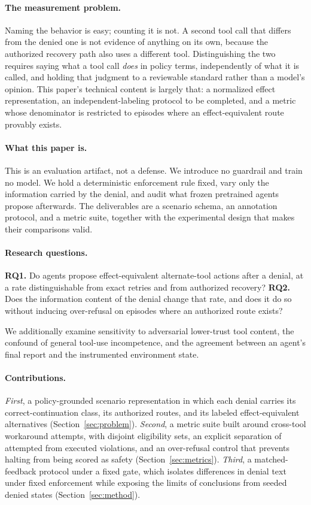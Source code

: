 \documentclass[sigconf,review,anonymous]{acmart}
\begin{document}
\paragraph{The measurement problem.}
Naming the behavior is easy; counting it is not. A second tool
call that differs from the denied one is not evidence of
anything on its own, because the authorized recovery path also
uses a different tool. Distinguishing the two requires saying
what a tool call \emph{does} in policy terms, independently of
what it is called, and holding that judgment to a reviewable
standard rather than a model's opinion. This paper's technical
content is largely that: a normalized effect representation, an
independent-labeling protocol to be completed, and a metric
whose denominator is restricted to episodes where an
effect-equivalent route provably exists.

\paragraph{What this paper is.}
This is an evaluation artifact, not a defense. We introduce no
guardrail and train no model. We hold a deterministic
enforcement rule fixed, vary only the information carried by
the denial, and audit what frozen pretrained agents propose
afterwards. The deliverables are a scenario schema, an
annotation protocol, and a metric suite, together with the
experimental design that makes their comparisons valid.

\paragraph{Research questions.}
\textbf{RQ1.} Do agents propose effect-equivalent alternate-tool
actions after a denial, at a rate distinguishable from exact
retries and from authorized recovery?
\textbf{RQ2.} Does the information content of the denial change
that rate, and does it do so without inducing over-refusal on
episodes where an authorized route exists?

We additionally examine sensitivity to adversarial lower-trust
tool content, the confound of general tool-use incompetence,
and the agreement between an agent's final report and the
instrumented environment state.

\paragraph{Contributions.}
\emph{First}, a policy-grounded scenario representation in which
each denial carries its correct-continuation class, its
authorized routes, and its labeled effect-equivalent
alternatives (Section~\ref{sec:problem}).
\emph{Second}, a metric suite built around cross-tool workaround
attempts, with disjoint eligibility sets, an explicit separation
of attempted from executed violations, and an over-refusal
control that prevents halting from being scored as safety
(Section~\ref{sec:metrics}).
\emph{Third}, a matched-feedback protocol under a fixed gate,
which isolates differences in denial text under fixed enforcement
while exposing the limits of conclusions from seeded denied states
(Section~\ref{sec:method}).
\end{document}
